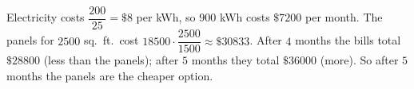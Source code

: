 Electricity costs $\dfrac{200}{25}=\$8$ per kWh, so $900$ kWh costs $\$7200$ per month. The panels for $2500$ sq.\ ft.\ cost $18500\cdot\dfrac{2500}{1500}\approx\$30833$. After $4$ months the bills total $\$28800$ (less than the panels); after $5$ months they total $\$36000$ (more). So after $\boxed{5}$ months the panels are the cheaper option.
